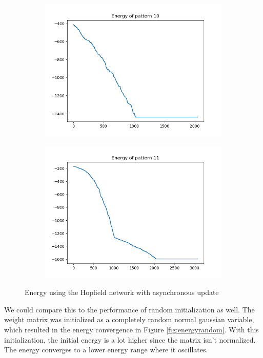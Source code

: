 \documentclass[a4paper]{article}
\begin{document}
 \begin{figure}[ht]
   \begin{subfigure}[b]{0.5\textwidth}
   \centering
   \includegraphics[width=\linewidth]{figures/ep10.png}
   \end{subfigure}
  \begin{subfigure}[b]{0.5\textwidth}
   \centering
   \includegraphics[width=\linewidth]{figures/ep11.png}
   \end{subfigure}
   \caption{Energy using the Hopfield network with asynchronous update}
   \label{fig:energy}
\end{figure}
We could compare this to the performance of random initialization as well. The weight matrix was initialized as a completely random normal gaussian variable, which resulted in the energy convergence in Figure \ref{fig:energyrandom}. With this initialization, the initial energy is a lot higher since the matrix isn't normalized. The energy converges to a lower energy range where it oscillates.
\end{document}

